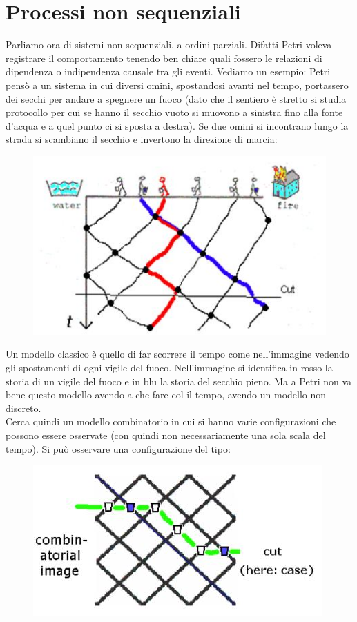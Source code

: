 \section{Processi non sequenziali}
Parliamo ora di sistemi non sequenziali, a ordini parziali. Difatti Petri voleva registrare il comportamento tenendo ben chiare quali fossero le relazioni di dipendenza o indipendenza causale tra gli eventi. Vediamo un esempio: Petri pensò a un sistema in cui diversi omini, spostandosi avanti nel tempo, portassero dei secchi per andare a spegnere un fuoco (dato che il sentiero  è
stretto si studia protocollo per cui se hanno il secchio vuoto si muovono a
sinistra fino alla fonte d'acqua e a quel punto ci si sposta a destra). Se due
omini si incontrano lungo la strada si scambiano 
il secchio e invertono la direzione di marcia:
\begin{figure}[H]
  \centering
  \includegraphics[scale = 0.5]{img/fire.jpg} 
\end{figure}
Un modello classico è quello di far scorrere il tempo come nell'immagine vedendo
gli spostamenti di ogni vigile del fuoco. Nell'immagine si identifica in rosso la storia di
un vigile del fuoco e in blu la storia del secchio pieno.
Ma a Petri non va bene questo modello avendo a che fare col il 
tempo, avendo un modello non discreto.\\
Cerca quindi un modello combinatorio in cui si hanno varie
configurazioni che possono essere osservate (con quindi non necessariamente una
sola scala del tempo).
Si può osservare una configurazione del tipo:
\begin{figure}[H]
  \centering
  \includegraphics[scale = 0.5]{img/fire2.jpg} 
\end{figure}
